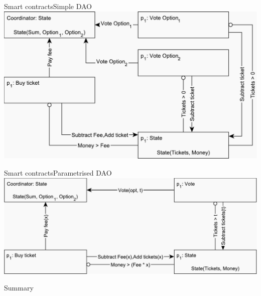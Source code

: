 \documentclass{beamer}
\begin{document}
\begin{frame}{Smart contracts}{Simple DAO}
	\centering
	\includegraphics[scale=0.5]{figures/dao-simple.pdf}
\end{frame}

\begin{frame}{Smart contracts}{Parametrised DAO}
	\centering
	\includegraphics[scale=0.5]{figures/dao-parametrised.pdf}	
\end{frame}

\begin{frame}{Summary}%
    
\end{frame}
\end{document}
